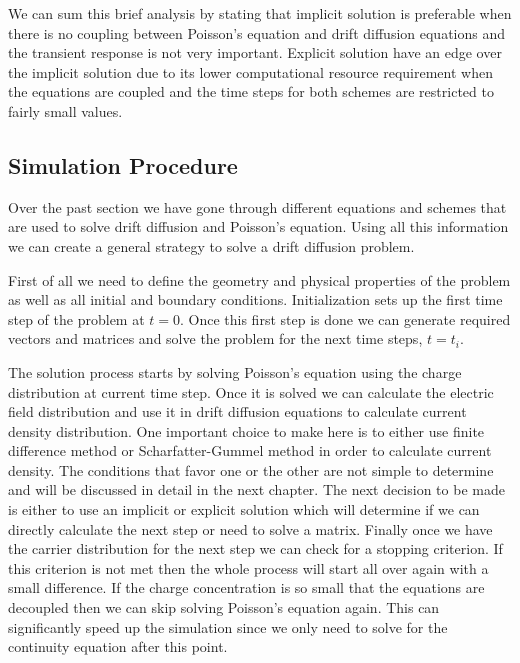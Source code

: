 We can sum this brief analysis by stating that implicit solution is preferable when there is no coupling between Poisson's equation and drift diffusion equations and the transient response is not very important. Explicit solution have an edge over the implicit solution due to its lower computational resource requirement when the equations are coupled and the time steps for both schemes are restricted to fairly small values. 

\clearpage
\subsection{Simulation Procedure}
Over the past section we have gone through different equations and schemes that are used to solve drift diffusion and Poisson's equation. Using all this information we can create a general strategy to solve a drift diffusion problem. 

First of all we need to define the geometry and physical properties of the problem as well as all initial and boundary conditions. Initialization sets up the first time step of the problem at $t=0$. Once this first step is done we can generate required vectors and matrices and solve the problem for the next time steps, $t=t_i$. 

The solution process starts by solving Poisson's equation using the charge distribution at current time step. Once it is solved we can calculate the electric field distribution and use it in drift diffusion equations to calculate current density distribution. One important choice to make here is to either use finite difference method or Scharfatter-Gummel method in order to calculate current density. The conditions that favor one or the other are not simple to determine and will be discussed in detail in the next chapter. The next decision to be made is either to use an implicit or explicit solution which will determine if we can directly calculate the next step or need to solve a matrix. Finally once we have the carrier distribution for the next step we can check for a stopping criterion. If this criterion is not met then the whole process will start all over again with a small difference. If the charge concentration is so small that the equations are decoupled then we can skip solving Poisson's equation again. This can significantly speed up the simulation since we only need to solve for the continuity equation after this point.

